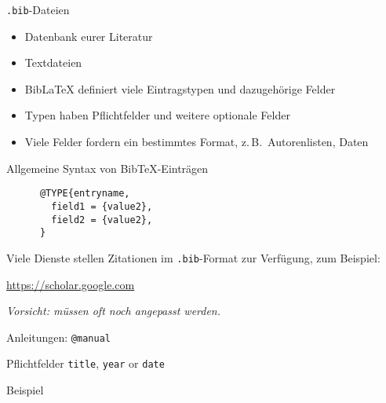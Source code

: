 \begin{frame}[fragile]{\texttt{.bib}-Dateien}
  \begin{itemize}
    \item Datenbank eurer Literatur
    \item Textdateien
    \item Bib\LaTeX{} definiert viele Eintragstypen und dazugehörige Felder
    \item Typen haben Pflichtfelder und weitere optionale Felder
    \item Viele Felder fordern ein bestimmtes Format, z.\,B.\ Autorenlisten, Daten
  \end{itemize}

  \begin{block}{Allgemeine Syntax von BibTeX-Einträgen}
    \begin{lstlisting}
      @TYPE{entryname,
        field1 = {value2},
        field2 = {value2},
      }
    \end{lstlisting}
  \end{block}


  Viele Dienste stellen Zitationen im \texttt{.bib}-Format zur Verfügung, zum Beispiel:
  \begin{center}
    \url{https://scholar.google.com}
  \end{center}

  \emph{Vorsicht: müssen oft noch angepasst werden.}
\end{frame}


\begin{frame}[fragile]{Anleitungen: \lstinline+@manual+}
  \begin{block}{Pflichtfelder}
    \texttt{title},
    \texttt{year} or \texttt{date}
  \end{block}

  \begin{block}{Beispiel}
    
  \end{block}
\end{frame}

